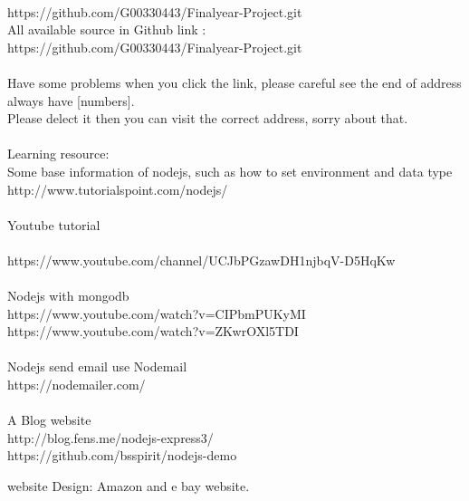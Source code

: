 \\https://github.com/G00330443/Finalyear-Project.git\\
All available source in Github link :\\https://github.com/G00330443/Finalyear-Project.git\\
\\ 
Have some problems when you click the link, please careful see the end of address always have [numbers].\\
Please delect it then you can visit the correct address, sorry about that.\\
\\
Learning resource:\\
Some base information of nodejs, such as how to set environment and data type\\
 http://www.tutorialspoint.com/nodejs/ \\
 \\
Youtube tutorial\\
\\https://www.youtube.com/channel/UCJbPGzawDH1njbqV-D5HqKw\\ 
\\
Nodejs with mongodb\\
https://www.youtube.com/watch?v=CIPbmPUKyMI\\
https://www.youtube.com/watch?v=ZKwrOXl5TDI\\
\\
Nodejs send email use Nodemail\\
https://nodemailer.com/\\
\\
A Blog website\\
http://blog.fens.me/nodejs-express3/\\
https://github.com/bsspirit/nodejs-demo

website Design:
Amazon and e bay website.
